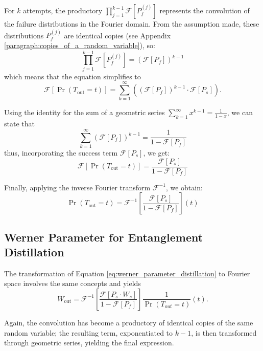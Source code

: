 \documentclass{masterthesis}
\begin{document}
For $k$ attempts, the productory \(\prod_{j=1}^{k-1} \mathcal{F}[P_f^{(j)}]\) represents the convolution of the failure distributions in the Fourier domain. From the assumption made, these distributions \( P_f^{(j)} \) are identical copies (see Appendix \ref{paragraph:copies_of_a_random_variable}), so:
\begin{equation}
    \prod_{j=1}^{k-1} \mathcal{F}[P_f^{(j)}] = \left( \mathcal{F}[P_f] \right)^{k-1}
\end{equation}
which means that the equation simplifies to
\begin{equation}
    \mathcal{F}[\Pr(T_{\text{out}} = t)] = \sum_{k=1}^{\infty} \left( \left( \mathcal{F}[P_f] \right)^{k-1} \cdot \mathcal{F}[P_s] \right) .
\end{equation}

Using the identity for the sum of a geometric series \(\sum_{k=1}^{\infty} x^{k-1} = \frac{1}{1-x}\), we can state that
\begin{equation}
    \sum_{k=1}^{\infty} \left( \mathcal{F}[P_f] \right)^{k-1} = \frac{1}{1 - \mathcal{F}[P_f]}
\end{equation}
thus, incorporating the success term \(\mathcal{F}[P_s]\), we get:
\begin{equation}
\mathcal{F}[\Pr(T_{\text{out}} = t)] = \frac{\mathcal{F}[P_s]}{1 - \mathcal{F}[P_f]}
\end{equation}

Finally, applying the inverse Fourier transform \(\mathcal{F}^{-1}\), we obtain:
\begin{equation}
    \Pr(T_{\text{out}} = t) = \mathcal{F}^{-1} \left[ \frac{\mathcal{F}[P_s]}{1 - \mathcal{F}[P_f]} \right](t)
\end{equation}

\subsection*{Werner Parameter for Entanglement Distillation}

The transformation of Equation \ref{eq:werner_parameter_distillation} to Fourier space involves the same concepts and yields
\begin{equation}\label{eq:werner_parameter_distillation_fourier}
    W_{\text{out}} = \mathcal{F}^{-1} \left[ \frac{\mathcal{F}[P_s \cdot W_s]}{1 - \mathcal{F}[P_f]} \right] \frac{1}{\Pr(T_{out}=t)}(t) .
\end{equation}

Again, the convolution has become a productory of identical copies of the same random variable; the resulting term, exponentiated to $k-1$, is then transformed through geometric series, yielding the final expression.
\end{document}
